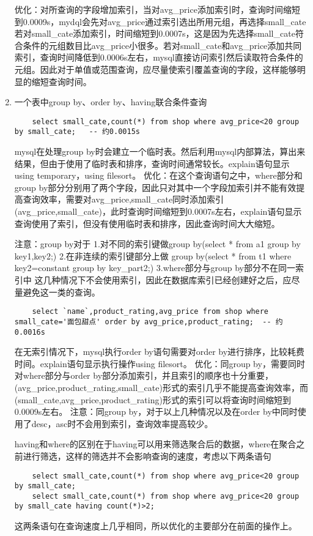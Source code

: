 \documentclass[a4paper, 11pt, nofonts, nocap, fancyhdr]{ctexart}
\begin{document}
\begin{enumerate}
优化：对所查询的字段增加索引，当对avg_price添加索引时，查询时间缩短到0.0009s，mydql会先对avg_price通过索引选出所用元组，再选择small_cate
若对small_cate添加索引，时间缩短到0.0007s，这是因为先选择small_cate符合条件的元组数目比avg_price小很多。若对small_cate和avg_price添加共同索引，查询时间降低到0.0006s左右，mysql直接访问索引然后读取符合条件的元组。因此对于单值或范围查询，应尽量使索引覆盖查询的字段，这样能够明显的缩短查询时间。\\
	
	\item 一个表中group by、order by、having联合条件查询

	\begin{lstlisting}
	select small_cate,count(*) from shop where avg_price<20 group by small_cate;   -- 约0.0015s
	\end{lstlisting}
mysql在处理group by时会建立一个临时表。然后利用mysql内部算法，算出来结果，但由于使用了临时表和排序，查询时间通常较长。explain语句显示using temporary，using filesort。
优化：在这个查询语句之中，where部分和group by部分分别用了两个字段，因此只对其中一个字段加索引并不能有效提高查询效率，需要对avg_price,small_cate同时添加索引(avg_price,small_cate)，此时查询时间缩短到0.0007s左右，explain语句显示查询使用了索引，但没有使用临时表和排序，因此查询时间大大缩短。

注意：group by对于
1.对不同的索引键做group by(select * from a1 group by key1,key2;)
2.在非连续的索引键部分上做 group by(select * from t1 where key2=constant group by key_part2;)
3.where部分与group by部分不在同一索引中
这几种情况下不会使用索引，因此在数据库索引已经创建好之后，应尽量避免这一类的查询。

	\begin{lstlisting}
	select `name`,product_rating,avg_price from shop where small_cate='面包甜点' order by avg_price,product_rating;  -- 约0.0016s
	\end{lstlisting}
在无索引情况下，mysql执行order by语句需要对order by进行排序，比较耗费时间。explain语句显示执行操作using filesort。
优化：同group by，需要同时对where部分与order by部分添加索引，并且索引的顺序也十分重要，(avg_price,product_rating,small_cate)形式的索引几乎不能提高查询效率，而(small_cate,avg_price,product_rating)形式的索引可以将查询时间缩短到0.0009s左右。
注意：同group by，对于以上几种情况以及在order by中同时使用了desc，asc时不会用到索引，查询效率提高较少。

having和where的区别在于having可以用来筛选聚合后的数据，where在聚合之前进行筛选，这样的筛选并不会影响查询的速度，考虑以下两条语句
	\begin{lstlisting}
	select small_cate,count(*) from shop where avg_price<20 group by small_cate;
	select small_cate,count(*) from shop where avg_price<20 group by small_cate having count(*)>2;
	\end{lstlisting}
这两条语句在查询速度上几乎相同，所以优化的主要部分在前面的操作上。

\end{enumerate}
\end{document}
